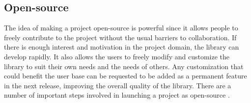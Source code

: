 \begin{specification}
\subsection{Open-source}
The idea of making a project open-source is powerful since it allows people to freely contribute to the project without the usual barriers to collaboration. If there is enough interest and motivation in the project domain, the library can develop rapidly. It also allows the users to freely modify and customize the library to suit their own needs and the needs of others. Any customization that could benefit the user base can be requested to be added as a permanent feature in the next release, improving the overall quality of the library. There are a number of important steps involved in launching a project as open-source \cite{open_source}.
\end{specification}
\vspace{1cm}
\clearpage